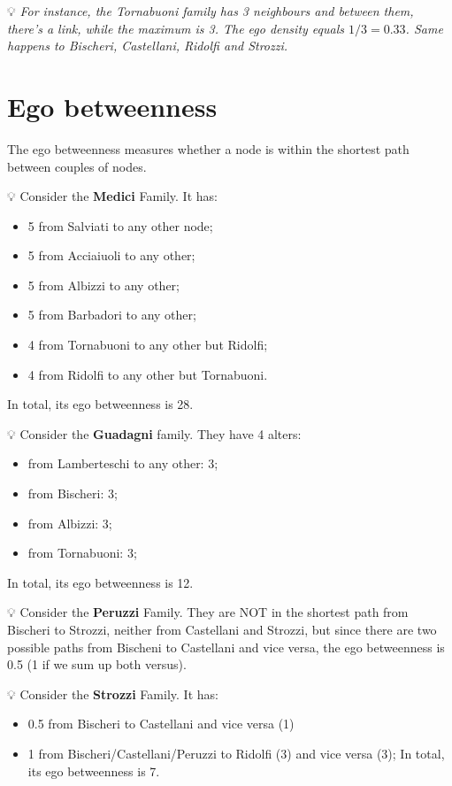 \documentclass[
  notitlepage,
  onecolumn,
  openany]{book}
\providecommand{\tightlist}{%
  \setlength{\itemsep}{0pt}\setlength{\parskip}{0pt}}
\begin{document}
💡 \emph{For instance, the Tornabuoni family has 3 neighbours and between them, there's a link, while the maximum is 3. The ego density equals \(1/3 = 0.33\). Same happens to Bischeri, Castellani, Ridolfi and Strozzi.}

\hypertarget{ego-betweenness}{%
\section{Ego betweenness}\label{ego-betweenness}}

The ego betweenness measures whether a node is within the shortest path between couples of nodes.

💡 Consider the \textbf{Medici} Family. It has:

\begin{itemize}
\tightlist
\item
  5 from Salviati to any other node;
\item
  5 from Acciaiuoli to any other;
\item
  5 from Albizzi to any other;
\item
  5 from Barbadori to any other;
\item
  4 from Tornabuoni to any other but Ridolfi;
\item
  4 from Ridolfi to any other but Tornabuoni.
\end{itemize}

In total, its ego betweenness is 28.

💡 Consider the \textbf{Guadagni} family. They have 4 alters:

\begin{itemize}
\tightlist
\item
  from Lamberteschi to any other: 3;
\item
  from Bischeri: 3;
\item
  from Albizzi: 3;
\item
  from Tornabuoni: 3;
\end{itemize}

In total, its ego betweenness is 12.

💡 Consider the \textbf{Peruzzi} Family. They are NOT in the shortest path from Bischeri to Strozzi, neither from Castellani and Strozzi, but since there are two possible paths from Bischeni to Castellani and vice versa, the ego betweenness is 0.5 (1 if we sum up both versus).

💡 Consider the \textbf{Strozzi} Family. It has:

\begin{itemize}
\tightlist
\item
  0.5 from Bischeri to Castellani and vice versa (1)
\item
  1 from Bischeri/Castellani/Peruzzi to Ridolfi (3) and vice versa (3);
  In total, its ego betweenness is 7.
\end{itemize}
\end{document}
